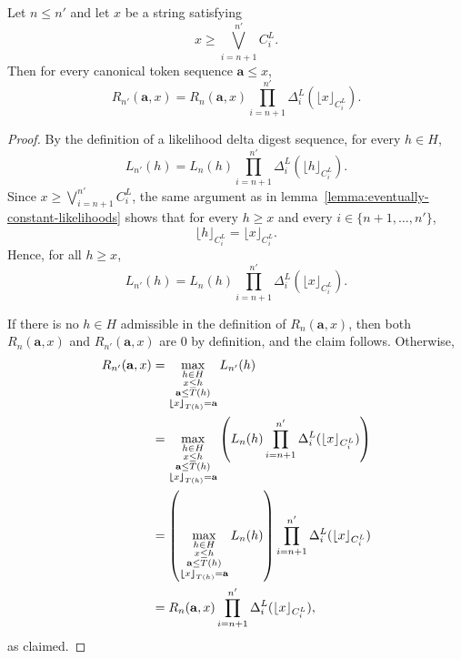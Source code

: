 \begin{lemma}
\label{lemma:mtcdl-likelihood-factorization}
    Let $n \leq n'$ and let $x$ be a string satisfying
    \[
    x \geq \bigvee_{i=n+1}^{n'} C^L_i.
    \]
    Then for every canonical token sequence $\mathbf{a} \leq x$,
    \[
    R_{n'}(\mathbf{a}, x)
    =
    R_n(\mathbf{a}, x)
    \prod_{i=n+1}^{n'} \Delta^L_i(\lfloor x \rfloor_{C^L_i}).
    \]
\end{lemma}
\begin{proof}
    By the definition of a likelihood delta digest sequence, for every $h \in H$,
    \[
    L_{n'}(h)
    =
    L_n(h)\prod_{i=n+1}^{n'} \Delta^L_i(\lfloor h \rfloor_{C^L_i}).
    \]
    Since $x \geq \bigvee_{i=n+1}^{n'} C^L_i$, the same argument as in
    lemma~\ref{lemma:eventually-constant-likelihoods} shows that for every
    $h \geq x$ and every $i \in \{n+1,\dots,n'\}$,
    \[
    \lfloor h \rfloor_{C^L_i} = \lfloor x \rfloor_{C^L_i}.
    \]
    Hence, for all $h \geq x$,
    \[
    L_{n'}(h)
    =
    L_n(h)\prod_{i=n+1}^{n'} \Delta^L_i(\lfloor x \rfloor_{C^L_i}).
    \]

    If there is no $h \in H$ admissible in the definition of $R_n(\mathbf{a}, x)$,
    then both $R_n(\mathbf{a}, x)$ and $R_{n'}(\mathbf{a}, x)$ are $0$ by
    definition, and the claim follows. Otherwise,
    \begin{align*}
    R_{n'}(\mathbf{a}, x)
    &=
    \max_{\substack{
        h \in H \\
        x \leq h \\
        \mathbf{a} \leq T(h) \\
        {\bm{\lfloor}} x {\bm{\rfloor}}_{T(h)} = \mathbf{a}
    }}
    L_{n'}(h) \\
    &=
    \max_{\substack{
        h \in H \\
        x \leq h \\
        \mathbf{a} \leq T(h) \\
        {\bm{\lfloor}} x {\bm{\rfloor}}_{T(h)} = \mathbf{a}
    }}
    \left(
        L_n(h)\prod_{i=n+1}^{n'} \Delta^L_i(\lfloor x \rfloor_{C^L_i})
    \right) \\
    &=
    \left(
        \max_{\substack{
            h \in H \\
            x \leq h \\
            \mathbf{a} \leq T(h) \\
            {\bm{\lfloor}} x {\bm{\rfloor}}_{T(h)} = \mathbf{a}
        }}
        L_n(h)
    \right)
    \prod_{i=n+1}^{n'} \Delta^L_i(\lfloor x \rfloor_{C^L_i}) \\
    &=
    R_n(\mathbf{a}, x)
    \prod_{i=n+1}^{n'} \Delta^L_i(\lfloor x \rfloor_{C^L_i}),
    \end{align*}
    as claimed.
\end{proof}

